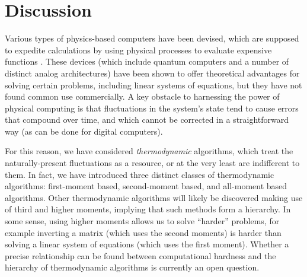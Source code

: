 \documentclass[prx,onecolumn,floatfix,longbibliography,notitlepage, nofootinbib]{revtex4-1}
\begin{document}
\section{Discussion}

Various types of physics-based computers have been devised, which are supposed to expedite calculations by using physical processes to evaluate expensive functions \cite{haensch2018next, small1993general,feynman1982simulating,preskill2018quantum, nielsen2000quantum}. These devices (which include quantum computers and a number of distinct analog architectures) have been shown to offer theoretical advantages for solving certain problems, including linear systems of equations, but they have not found common use commercially. A key obstacle to harnessing the power of physical computing is that fluctuations in the system's state tend to cause errors that compound over time, and which cannot be corrected in a straightforward way \cite{huang2017analog} (as can be done for digital computers). 

For this reason, we have considered \emph{thermodynamic} algorithms, which treat the naturally-present fluctuations as a resource, or at the very least are indifferent to them. In fact, we have introduced three distinct classes of thermodynamic algorithms: first-moment based, second-moment based, and all-moment based algorithms. Other thermodynamic algorithms will likely be discovered making use of third and higher moments, implying that such methods form a hierarchy. In some sense, using higher moments allows us to solve ``harder'' problems, for example inverting a matrix (which uses the second moments) is harder than solving a linear system of equations (which uses the first moment). Whether a precise relationship can be found between computational hardness and the hierarchy of thermodynamic algorithms is currently an open question.
\end{document}

